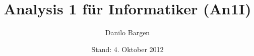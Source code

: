 


\subject{Hochschule für Technik Rapperswil}
\title{Analysis 1 für Informatiker (An1I)}
\author{Danilo Bargen}
\date{Stand: 4. Oktober 2012}














